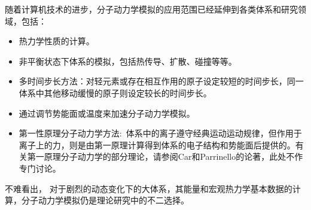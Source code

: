 随着计算机技术的进步，分子动力学模拟的应用范围已经延伸到各类体系和研究领域，包括：
\begin{itemize}
	\item 热力学性质的计算。
	\item 非平衡状态下体系的模拟\cite{CMP8-247_2005}，包括热传导、扩散、碰撞等等。
	\item 多时间步长方法：对轻元素或存在相互作用的原子设定较短的时间步长，同一体系中其他移动缓慢的原子则设定较长的时间步长。
	\item 通过调节势能面或温度来加速分子动力学模拟\cite{JCP106-4665_1997,JCP112-9599_2000}。
	\item 第一性原理分子动力学方法:~体系中的离子遵守经典运动运动规律，但作用于离子上的力，则是由第一原理计算得到体系的电子结构和势能面后提供的。有关第一原理分子动力学的部分理论，请参阅\textrm{Car}和\textrm{Parrinello}的论著\cite{PRL55-2471_1985}，此处不作专门讨论。
\end{itemize}

不难看出，%
对于剧烈的动态变化下的大体系，其能量和宏观热力学基本数据的计算，分子动力学模拟仍是理论研究中的不二选择。
